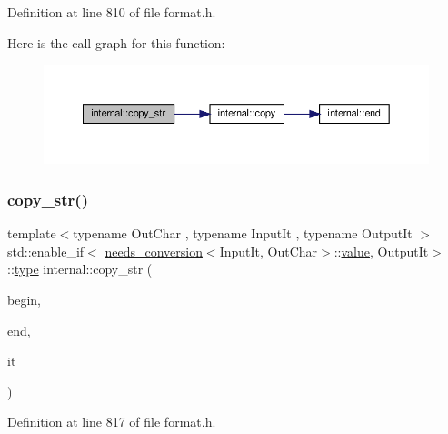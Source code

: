 Definition at line 810 of file format.\+h.

Here is the call graph for this function\+:
\nopagebreak
\begin{figure}[H]
\begin{center}
\leavevmode
\includegraphics[width=350pt]{namespaceinternal_a8d09228af5e19a701d0d6372a036cf24_cgraph}
\end{center}
\end{figure}
\mbox{\label{namespaceinternal_a6ad6580819e6e957d9c2cab372b6e620}} 
\subsubsection{\texorpdfstring{copy\+\_\+str()}{copy\_str()}\hspace{0.1cm}{\footnotesize\ttfamily [2/2]}}
{\footnotesize\ttfamily template$<$typename Out\+Char , typename Input\+It , typename Output\+It $>$ \\
std\+::enable\+\_\+if$<$ \hyperlink{structinternal_1_1needs__conversion}{needs\+\_\+conversion}$<$Input\+It, Out\+Char$>$\+::\hyperlink{classinternal_1_1value}{value}, Output\+It$>$\+::\hyperlink{namespaceinternal_a8661864098ac0acff9a6dd7e66f59038}{type} internal\+::copy\+\_\+str (\begin{DoxyParamCaption}\item[{Input\+It}]{begin,  }\item[{Input\+It}]{end,  }\item[{Output\+It}]{it }\end{DoxyParamCaption})}



Definition at line 817 of file format.\+h.

